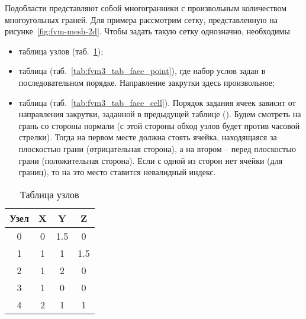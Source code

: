 Подобласти представляют собой многогранники с произвольным количеством многоугольных граней.
Для примера рассмотрим сетку, представленную на рисунке~\ref{fig:fvm-mesh-2d}.
Чтобы задать такую сетку однозначно, необходимы
\begin{itemize}
\item
таблица узлов (таб.~\ref{tab:fvm3_tab_point});
\item
таблица  (таб.~\ref{tab:fvm3_tab_face_point}), где набор услов задан в последовательном порядке. Направление закрутки здесь произвольное;
\item
таблица  (таб.~\ref{tab:fvm3_tab_face_cell}). Порядок задания ячеек зависит от направления закрутки, заданной в предыдущей таблице ().
Будем смотреть на грань со стороны нормали (с этой стороны обход узлов будет против часовой стрелки).
Тогда на первом месте должна стоять ячейка, находящаяся за плоскостью грани (отрицательная сторона), а на втором -- перед плоскостью грани (положительная сторона).
Если с одной из сторон нет ячейки (для границ), то на это место ставится невалидный индекс.
\end{itemize}

\begin{table}[H]
\begin{center}
  \begin{minipage}[t]{.4\textwidth}
    \centering
    \begin{tabular}[t]{c|c|c|c}
    Узел & X & Y & Z \\
    \hline
    0 & 0   & 1.5 & 0   \\
    1 & 1   & 1   & 1.5 \\
    2 & 1   & 2   & 0   \\
    3 & 1   & 0   & 0   \\
    4 & 2   & 1   & 1   \\
    \end{tabular}
    \caption{\label{tab:fvm3_tab_point}Таблица узлов}
  \end{minipage}%
\end{center}
\end{table}


